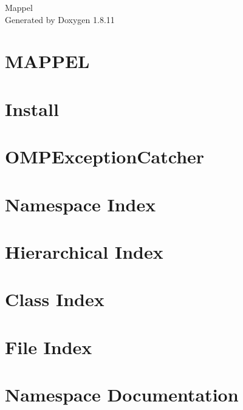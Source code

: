 \documentclass[twoside]{article}
\newcommand{\+}{\discretionary{\mbox{\scriptsize$\hookleftarrow$}}{}{}}
\begin{document}
\hypersetup{pageanchor=false,
             bookmarksnumbered=true,
             pdfencoding=unicode
            }
\begin{titlepage}
\vspace*{7cm}
\begin{center}%
{\Large Mappel }\\
\vspace*{1cm}
{\large Generated by Doxygen 1.8.11}\\
\end{center}
\end{titlepage}
\tableofcontents
{}
\hypersetup{pageanchor=true}

\section{M\+A\+P\+P\+EL}
\label{index}\hypertarget{index}{}
\section{Install}
\label{Install}
\hypertarget{Install}{}

\section{O\+M\+P\+Exception\+Catcher}
\label{md__home_travis_build_markjolah_Mappel_include_Mappel_OMPExceptionCatcher_README}
\hypertarget{md__home_travis_build_markjolah_Mappel_include_Mappel_OMPExceptionCatcher_README}{}

\section{Namespace Index}

\section{Hierarchical Index}

\section{Class Index}

\section{File Index}

\section{Namespace Documentation}














\end{document}

